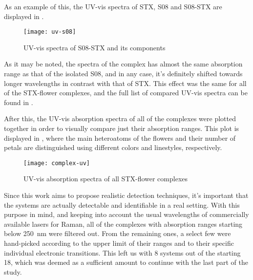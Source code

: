 As an example of this, the UV-vis spectra of STX, S08 and S08-STX are displayed in .

\begin{figure}
    \texttt{[image: uv-s08]}
    \caption[UV-vis spectrum of S08-STX]{UV-vis spectra of S08-STX and its components}
\end{figure}

As it may be noted, the spectra of the complex has almost the same absorption range as that of the isolated S08, and in any case, it's definitely shifted towards longer wavelengths in contrast with that of STX.
This effect was the same for all of the STX-flower complexes, and the full list of compared UV-vis spectra can be found in .

After this, the UV-vis absorption spectra of all of the complexes were plotted together in order to visually compare just their absorption ranges. This plot is displayed in , where the main heteroatoms of the flowers and their number of petals are distinguished using different colors and linestyles, respectively.

\begin{figure*}
    \texttt{[image: complex-uv]}
    \caption[UV-vis absorption spectra of all complexes]{UV-vis absorption spectra of all STX-flower complexes}
\end{figure*}

Since this work aims to propose realistic detection techniques, it's important that the systems are actually detectable and identifiable in a real setting.
With this purpose in mind, and keeping into account the usual wavelengths of commercially available lasers for Raman, all of the complexes with absorption ranges starting below \SI{250}{\nano\metre} were filtered out.
From the remaining ones, a select few were hand-picked according to the upper limit of their ranges and to their specific individual electronic transitions.
This left us with 8 systems out of the starting 18, which was deemed as a sufficient amount to continue with the last part of the study.

